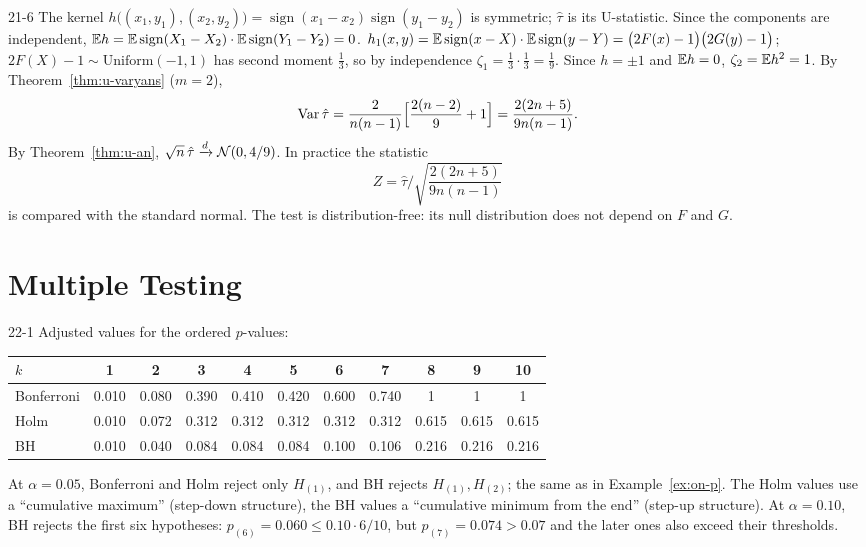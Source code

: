 \begin{solution}{21-6}
The kernel $h\big((x_1,y_1),(x_2,y_2)\big)=\operatorname{sign}(x_1-x_2)\operatorname{sign}(y_1-y_2)$ is symmetric; $\hat\tau$ is its U-statistic. Since the components are independent, $\mathbb{E} h=\mathbb{E}\operatorname{sign}(X_1-X_2)\cdot\mathbb{E}\operatorname{sign}(Y_1-Y_2)=0$. $h_1(x,y)=\mathbb{E}\operatorname{sign}(x-X)\cdot\mathbb{E}\operatorname{sign}(y-Y)=\big(2F(x)-1\big)\big(2G(y)-1\big)$; $2F(X)-1\sim\text{Uniform}(-1,1)$ has second moment $\frac13$, so by independence $\zeta_1=\frac13\cdot\frac13=\frac19$. Since $h=\pm1$ and $\mathbb{E} h=0$, $\zeta_2=\mathbb{E} h^2=1$. By Theorem~\ref{thm:u-varyans} ($m=2$),
\[
\operatorname{Var}\hat\tau=\frac{2}{n(n-1)}\Big[\frac{2(n-2)}{9}+1\Big]=\frac{2(2n+5)}{9n(n-1)} .
\]
By Theorem~\ref{thm:u-an}, $\sqrt n\,\hat\tau\xrightarrow{d}\mathcal{N}(0,4/9)$. In practice the statistic\[Z=\hat\tau\Big/\sqrt{\frac{2(2n+5)}{9n(n-1)}}\]is compared with the standard normal. The test is distribution-free: its null distribution does not depend on $F$ and $G$.
\end{solution}

\section{Multiple Testing}

\begin{solution}{22-1}
Adjusted values for the ordered $p$-values:
\begin{center}
\footnotesize
\begin{tabular}{lcccccccccc}
\toprule
$k$ & 1 & 2 & 3 & 4 & 5 & 6 & 7 & 8 & 9 & 10\\
\midrule
Bonferroni & 0.010 & 0.080 & 0.390 & 0.410 & 0.420 & 0.600 & 0.740 & 1 & 1 & 1\\
Holm & 0.010 & 0.072 & 0.312 & 0.312 & 0.312 & 0.312 & 0.312 & 0.615 & 0.615 & 0.615\\
BH & 0.010 & 0.040 & 0.084 & 0.084 & 0.084 & 0.100 & 0.106 & 0.216 & 0.216 & 0.216\\
\bottomrule
\end{tabular}
\end{center}
At $\alpha=0.05$, Bonferroni and Holm reject only $H_{(1)}$, and BH rejects $H_{(1)},H_{(2)}$; the same as in Example~\ref{ex:on-p}. The Holm values use a ``cumulative maximum'' (step-down structure), the BH values a ``cumulative minimum from the end'' (step-up structure). At $\alpha=0.10$, BH rejects the first six hypotheses: $p_{(6)}=0.060\le0.10\cdot6/10$, but $p_{(7)}=0.074>0.07$ and the later ones also exceed their thresholds.
\end{solution}

